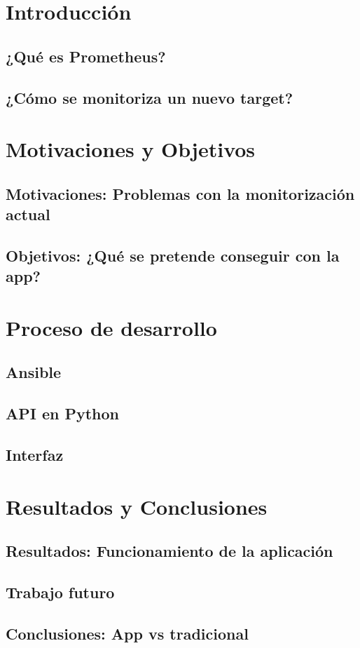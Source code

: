 \documentclass[]{beamer}
\begin{document}
\frame{\titlepage}
\tableofcontents

\section{Introducción}
\subsection{¿Qué es Prometheus?}


\subsection{¿Cómo se monitoriza un nuevo target?}



\section{Motivaciones y Objetivos}
\subsection{Motivaciones: Problemas con la monitorización actual}


\subsection{Objetivos: ¿Qué se pretende conseguir con la app?}



\section{Proceso de desarrollo}
\subsection{Ansible}


\subsection{API en Python}


\subsection{Interfaz}



\section{Resultados y Conclusiones}
\subsection{Resultados: Funcionamiento de la aplicación}


\subsection{Trabajo futuro}


\subsection{Conclusiones: App vs tradicional}

\end{document}
